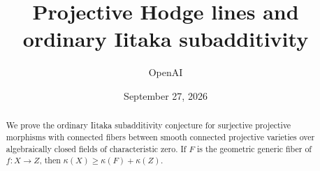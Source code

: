 \documentclass[11pt]{amsart}
\title[Projective Hodge lines and ordinary subadditivity]{Projective Hodge lines and ordinary Iitaka subadditivity}
\author{OpenAI}
\date{September 27, 2026}
\theoremstyle{definition}
\theoremstyle{remark}
\numberwithin{equation}{section}
\begin{document}
\begin{abstract}
We prove the ordinary Iitaka subadditivity conjecture for surjective
projective morphisms with connected fibers between smooth connected
projective varieties over algebraically closed fields of characteristic
zero. If $F$ is the geometric generic fiber of $f:X\to Z$, then
$\kappa(X)\geq\kappa(F)+\kappa(Z)$.
\end{abstract}
\maketitle
\tableofcontents











\end{document}
